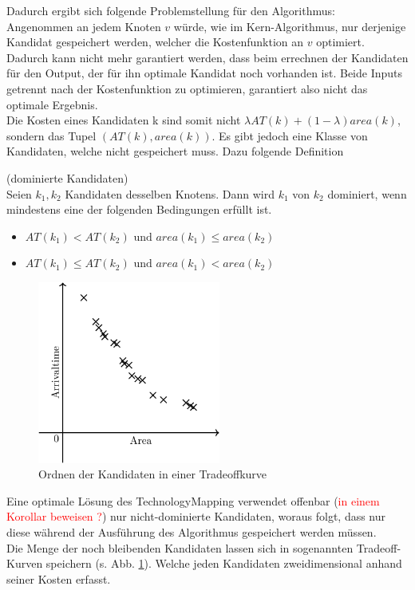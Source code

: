 \documentclass[11pt, a4paper, german]{article}
\newcommand{\TM}{TechnologyMapping }
\begin{document}
Dadurch ergibt sich folgende Problemstellung für den Algorithmus: \\
Angenommen an jedem Knoten $v$ würde, wie im Kern-Algorithmus, nur derjenige Kandidat gespeichert werden, welcher die Kostenfunktion an $v$ optimiert. Dadurch kann nicht mehr garantiert werden, dass beim errechnen der Kandidaten für den Output, der für ihn optimale Kandidat noch vorhanden ist. Beide Inputs getrennt nach der Kostenfunktion zu optimieren, garantiert also nicht das optimale Ergebnis.\\

Die Kosten eines Kandidaten k sind somit nicht $\lambda AT(k) +(1-\lambda )area(k)$,  sondern das Tupel $(AT(k), area(k))$.
Es gibt jedoch eine Klasse von Kandidaten, welche nicht gespeichert muss. Dazu folgende Definition\\

\begin{definition}{(dominierte Kandidaten)}\\
	Seien $k_1, k_2$ Kandidaten desselben Knotens. Dann wird $k_1$ von $k_2$ dominiert, wenn mindestens eine der folgenden Bedingungen erfüllt ist.
	\begin{itemize}
	\item $AT(k_1) < AT(k_2) \text { und  }area(k_1) \leq area(k_2)$
	\item $	AT(k_1) \leq AT(k_2) \text{ und } area(k_1) < area(k_2)$	
	\end{itemize}
\end{definition}

 \begin{figure}
		\includegraphics[width = 6cm]{pictures/compiled/tradeoff_kurve}
		\caption{Ordnen der Kandidaten in einer Tradeoffkurve}
		\label{bild:tradeoff_kurve}
\end{figure}
Eine optimale Lösung des \TM verwendet offenbar (\textcolor{red}{in einem Korollar beweisen ?}) nur nicht-dominierte Kandidaten, woraus folgt, dass nur diese während der Ausführung des Algorithmus gespeichert werden müssen.\\
Die Menge der noch bleibenden Kandidaten lassen sich in sogenannten Tradeoff-Kurven speichern (s. Abb. \ref{bild:tradeoff_kurve}). Welche jeden Kandidaten zweidimensional anhand seiner Kosten erfasst.\\
\end{document}
